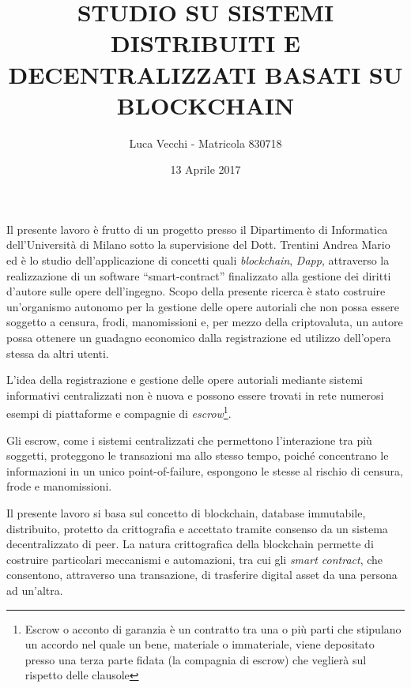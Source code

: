 \documentclass[11pt,oneside,a4paper]{article}
\title{STUDIO SU SISTEMI DISTRIBUITI E DECENTRALIZZATI BASATI SU BLOCKCHAIN}
\author{Luca Vecchi - Matricola 830718}
\date{13 Aprile 2017}
\begin{document}
	
	\maketitle
	
	
	Il presente lavoro è frutto di un progetto presso il Dipartimento di Informatica dell'Università di Milano sotto la supervisione del Dott. Trentini Andrea Mario ed è lo studio dell'applicazione di concetti quali \textit{blockchain}, \textit{Dapp}, attraverso la realizzazione di un software ``smart-contract'' finalizzato alla gestione dei diritti d'autore sulle opere dell'ingegno. Scopo della presente ricerca è stato costruire un'organismo autonomo per la gestione delle opere autoriali che non possa essere soggetto a censura, frodi, manomissioni e, per mezzo della criptovaluta, un autore possa ottenere un guadagno economico dalla registrazione ed utilizzo dell'opera stessa da altri utenti.%
	
	L'idea della registrazione e gestione delle opere autoriali mediante sistemi informativi centralizzati non è nuova e possono essere trovati in rete numerosi esempi di piattaforme e compagnie di \textit{escrow}\footnote{Escrow o acconto di garanzia è un contratto tra una o più parti che stipulano un accordo nel quale un bene, materiale o immateriale, viene depositato presso una terza parte fidata (la compagnia di escrow) che veglierà sul rispetto delle clausole}.%

	Gli escrow, come i sistemi centralizzati che permettono l'interazione tra più soggetti, proteggono le transazioni ma allo stesso tempo, poiché concentrano le informazioni in un unico point-of-failure, espongono le stesse al rischio di censura, frode e manomissioni. 
	
	Il presente lavoro si basa sul concetto di blockchain, database immutabile, distribuito, protetto da crittografia e accettato tramite consenso da un sistema decentralizzato di peer. La natura crittografica della blockchain permette di costruire particolari meccanismi e automazioni, tra cui gli \textit{smart contract}, che consentono, attraverso una transazione, di trasferire digital asset da una persona ad un'altra. 
	
\end{document}
